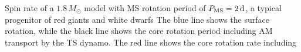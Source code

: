  \label{fig:MRI1.8rot} Spin rate of a $1.8 \, M_\odot$ model with MS rotation period of $P_{\rm MS} = 2 \, {\rm d}$, a typical progenitor of red giants and white dwarfs  The blue line shows the surface rotation, while the black line shows the core rotation period including AM transport by the TS dynamo. The red line shows the core rotation rate including